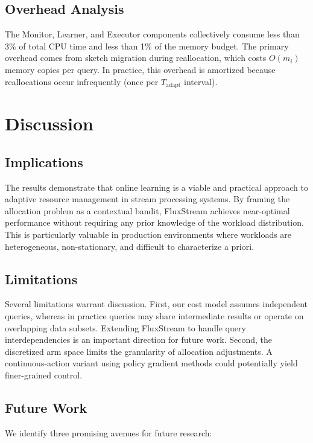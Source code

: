\documentclass[
    language=english,
    doctype=dissertation,
    institution=none,
    titlestyle=book,
]{../../omnilatex}
\begin{document}
\section{Overhead Analysis}

The Monitor, Learner, and Executor components collectively consume less than 3\% of total CPU time and less than 1\% of the memory budget. The primary overhead comes from sketch migration during reallocation, which costs $O(m_i)$ memory copies per query. In practice, this overhead is amortized because reallocations occur infrequently (once per $T_{\text{adapt}}$ interval).

\chapter{Discussion}\label{ch:discussion}

\section{Implications}

The results demonstrate that online learning is a viable and practical approach to adaptive resource management in stream processing systems. By framing the allocation problem as a contextual bandit, FluxStream achieves near-optimal performance without requiring any prior knowledge of the workload distribution. This is particularly valuable in production environments where workloads are heterogeneous, non-stationary, and difficult to characterize a priori.

\section{Limitations}

Several limitations warrant discussion. First, our cost model assumes independent queries, whereas in practice queries may share intermediate results or operate on overlapping data subsets. Extending FluxStream to handle query interdependencies is an important direction for future work. Second, the discretized arm space limits the granularity of allocation adjustments. A continuous-action variant using policy gradient methods could potentially yield finer-grained control.

\section{Future Work}

We identify three promising avenues for future research:
\end{document}
